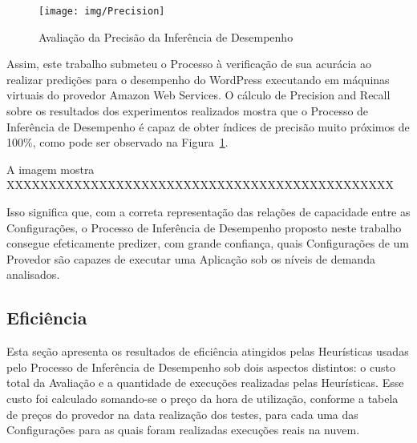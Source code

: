 \begin{figure}[hbt]
  \caption{\label{fig:avaliacao_precisao}Avaliação da Precisão da Inferência de Desempenho}
  \begin{center}
    \texttt{[image: img/Precision]}
  \end{center}
\end{figure}

Assim, este trabalho submeteu o Processo à verificação de sua acurácia ao realizar
predições para o desempenho do WordPress executando em máquinas virtuais do provedor
Amazon Web Services. O cálculo de Precision and Recall~\cite{powers2011evaluation} 
sobre os resultados dos experimentos realizados mostra que o Processo de Inferência 
de Desempenho é capaz de obter índices de precisão muito próximos de 100\%, como 
pode ser observado na Figura~\ref{fig:avaliacao_precisao}. 

A imagem mostra XXXXXXXXXXXXXXXXXXXXXXXXXXXXXXXXXXXXXXXXXXXXXX

Isso significa que, com a correta representação das relações de capacidade entre
as Configurações, o Processo de Inferência de Desempenho proposto neste trabalho
consegue efeticamente predizer, com grande confiança, quais Configurações de um 
Provedor são capazes de executar uma Aplicação sob os níveis de demanda analisados. 

\subsection{Eficiência}
\label{subsec:resultados_eficiencia}
Esta seção apresenta os resultados de eficiência atingidos pelas Heurísticas usadas 
pelo Processo de Inferência de Desempenho sob dois aspectos distintos: o custo 
total da Avaliação e a quantidade de execuções realizadas pelas Heurísticas. Esse 
custo foi calculado somando-se o preço da hora de utilização, conforme a tabela 
de preços do provedor na data realização dos testes, para cada uma das Configurações 
para as quais foram realizadas execuções reais na nuvem. 

